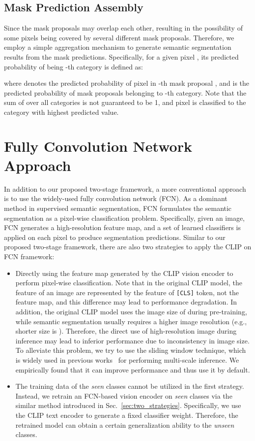 \documentclass[runningheads]{llncs}
\begin{document}
\subsection{Mask Prediction Assembly}
\label{sec:mask_prediction_assembly}
Since the mask proposals may overlap each other, resulting in the possibility of some pixels being covered by several different mask proposals. Therefore, we employ a simple aggregation mechanism to generate semantic segmentation results from the mask predictions. Specifically, for a given pixel , its predicted probability of being -th category is defined as:


where  denotes the predicted probability of pixel  in -th mask proposal , and  is the predicted probability of mask proposals  belonging to -th category. Note that the sum of  over all categories is not guaranteed to be 1, and pixel  is classified to the category with highest predicted value.

\section{Fully Convolution Network Approach}
In addition to our proposed two-stage framework, a more conventional approach is to use the widely-used fully convolution network (FCN). As a dominant method in supervised semantic segmentation, FCN formulates the semantic segmentation as a pixel-wise classification problem. Specifically, given an image, FCN generates a high-resolution feature map, and a set of learned classifiers is applied on each pixel to produce segmentation predictions. Similar to our proposed two-stage framework, there are also two strategies to apply the CLIP on FCN framework:

\begin{itemize}
    \item Directly using the feature map generated by the CLIP vision encoder to perform pixel-wise classification. Note that in the original CLIP model, the feature of an image are represented by the feature of \texttt{[CLS]} token, not the feature map, and this difference may lead to performance degradation. In addition, the original CLIP model uses the image size of  during pre-training, while semantic segmentation usually requires a higher image resolution (e.g., shorter size is ). Therefore, the direct use of high-resolution image during inference may lead to inferior performance due to inconsistency in image size. To alleviate this problem, we try to use the sliding window technique, which is widely used in previous works~\cite{chen2017deeplab} for performing multi-scale inference. We empirically found that it can improve performance and thus use it by default.
    
    \item The training data of the \emph{seen} classes cannot be utilized in the first strategy. Instead, we retrain an FCN-based vision encoder on \emph{seen} classes via the similar method introduced in Sec.~\ref{sec:two_strategies}. Specifically, we use the CLIP text encoder to generate a fixed classifier weight. Therefore, the retrained model can obtain a certain generalization ability to the \emph{unseen} classes.
\end{itemize}
\end{document}
